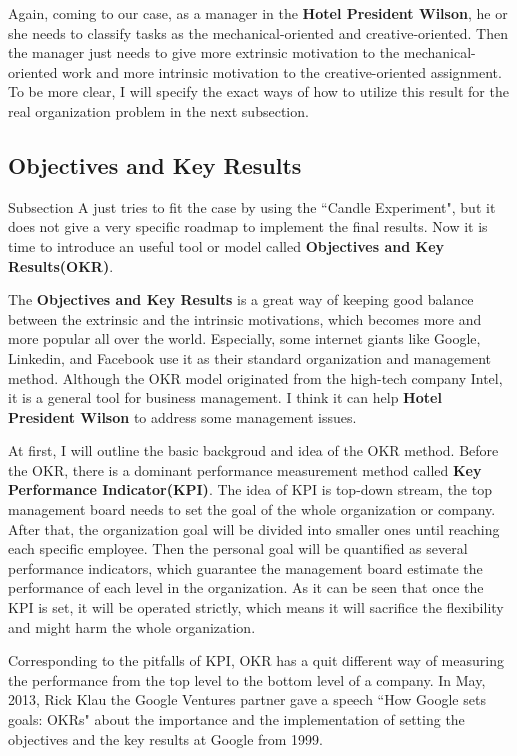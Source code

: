 \documentclass[12pt,onecolumn,a4paper]{IEEEtran}
\begin{document}
Again, coming to our case, as a manager in the \textbf{Hotel President Wilson}, he or she needs to classify tasks as the mechanical-oriented and creative-oriented. Then the manager just needs to give more extrinsic motivation to the mechanical-oriented work and more intrinsic motivation to the creative-oriented assignment. To be more clear, I will specify the exact ways of how to utilize this result for the real organization problem in the next subsection.

\subsection{\textbf{Objectives and Key Results}}
Subsection A just tries to fit the case by using the ``Candle Experiment", but it does not give a very specific roadmap to implement the final results. Now it is time to introduce an useful tool or model called \textbf{Objectives and Key Results(OKR)}. 

The \textbf{Objectives and Key Results} is a great way of keeping good balance between the extrinsic and the intrinsic motivations, which becomes more and more popular all over the world. Especially, some internet giants like Google, Linkedin, and Facebook use it as their standard organization and management method. Although the OKR model originated from the high-tech company Intel, it is a general tool for business management. I think it can help \textbf{Hotel President Wilson} to address some management issues. 

At first, I will outline the basic backgroud and idea of the OKR method. Before the OKR, there is a dominant performance measurement method called \textbf{Key Performance Indicator(KPI)}. The idea of KPI is top-down stream, the top management board needs to set the goal of the whole organization or company. After that, the organization goal will be divided into smaller ones until reaching each specific employee. Then the personal goal will be quantified as several performance indicators, which guarantee the management board estimate the performance of each level in the organization. As it can be seen that once the KPI is set, it will be operated strictly, which means it will sacrifice the flexibility and might harm the whole organization. 

Corresponding to the pitfalls of KPI, OKR has a quit different way of measuring the performance from the top level to the bottom level of a company. In May, 2013, Rick Klau the Google Ventures partner gave a speech ``How Google sets goals: OKRs"\cite{OKRGV} about the importance and the implementation of setting the objectives and the key results at Google from 1999. 
\end{document}
